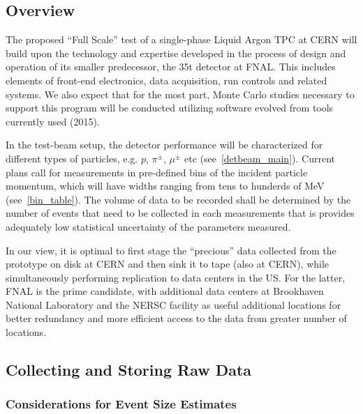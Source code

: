 
\subsection{Overview}
The proposed ``Full Scale'' test of a single-phase Liquid Argon TPC at CERN will build upon the technology and expertise developed in the
process of design and operation of its smaller predecessor, the 35t detector at FNAL.
This includes elements of front-end electronics, data acquisition, run controls and related systems. We also expect that for the most part,
Monte Carlo studies necessary to support this program will be conducted utilizing software evolved from tools currently used (2015).

In the test-beam setup, the detector performance will be characterized for different types of particles, e.g. $p$, $\pi^{\pm}$, $\mu^{\pm}$ etc (see~\ref{detbeam_main}).
Current plans call for measurements in pre-defined bins of the incident particle momentum, which will have widths ranging from tens to
hunderds of MeV (see~\ref{bin_table}). The volume of data to be recorded shall be determined by the number of events that need to be collected in each measurements that is
provides adequately low statistical uncertainty of the parameters measured.

In our view, it is optimal to first stage the ``precious'' data collected from the prototype on disk at CERN and then sink it to tape (also at CERN),
while simultaneously performing replication to data centers in the US. For the latter, FNAL is the prime candidate, with additional data centers at Brookhaven National Laboratory
and the NERSC facility as useful additional locations for better redundancy and more efficient access to the data from greater number of locations.

\subsection{Collecting and Storing Raw Data}

\subsubsection{Considerations for Event Size Estimates}

